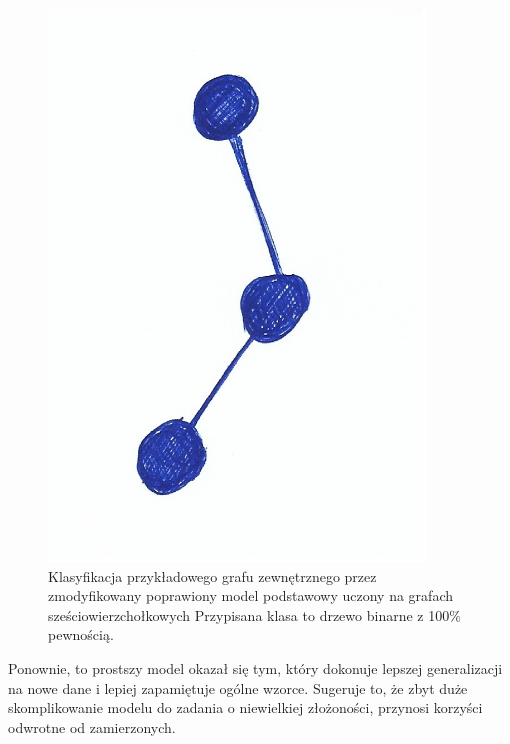 \begin{figure}[ht]
	\centering
	\includegraphics[width=10cm]{../graph_classification/test_graphs/drawn/path-4.png}
	\caption{Klasyfikacja przykładowego grafu zewnętrznego przez zmodyfikowany poprawiony model podstawowy
		uczony na grafach sześciowierzchołkowych
		Przypisana klasa to drzewo binarne z 100\% pewnością.}
	\label{Fig:tests-best-1d}
\end{figure}
\FloatBarrier

Ponownie, to prostszy model okazał się tym, który dokonuje lepszej generalizacji na nowe dane
i lepiej zapamiętuje ogólne wzorce.
Sugeruje to, że zbyt duże skomplikowanie modelu do zadania o niewielkiej złożoności,
przynosi korzyści odwrotne od zamierzonych.